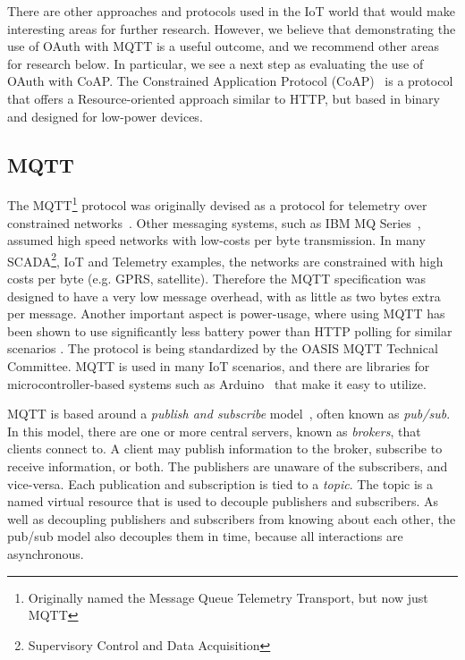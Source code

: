 \documentclass{IEEEtran}
\newif\iflong
\begin{document}
There are other approaches and protocols used in the IoT world that
would make interesting areas for further research. However, we believe that demonstrating the use of OAuth
with MQTT is a useful outcome, and we recommend other areas for research below. In particular, we see a next
step as evaluating the use of OAuth with CoAP. The Constrained Application Protocol 
(CoAP)~\cite{shelby2013constrained} is a protocol 
that offers a Resource-oriented approach similar to HTTP, but based in binary and designed for low-power devices. 
\fi

\subsection{MQTT}
The MQTT\footnote{Originally named the Message Queue Telemetry Transport, but now just MQTT} protocol was originally devised 
as a protocol for telemetry over constrained networks~\cite{mqtt-history}. Other messaging systems, such as IBM 
MQ Series~\cite{gilman1996distributed}, assumed high speed networks with low-costs per byte transmission. 
In many SCADA\footnote{Supervisory Control and Data Acquisition}, IoT and Telemetry examples, the networks are constrained 
with high costs per byte (e.g. GPRS, satellite). Therefore the MQTT specification was designed to have a very low message overhead, 
with as little as two bytes extra per message. Another important aspect is power-usage, where using MQTT has been shown to use significantly less battery power
than HTTP polling for similar scenarios \cite{nicholaspowerblog}.  The protocol is being standardized by the OASIS MQTT Technical Committee\cite{mqtt-oasis}. MQTT is used in many IoT scenarios, and there are libraries for microcontroller-based systems such as 
Arduino~\cite{arduino} that make it easy to utilize.

MQTT is based around a \emph{publish and subscribe} model~\cite{eugster2003many}, often known as \emph{pub/sub}.
In this model, there are one or more central servers, known as \emph{brokers}, that clients connect to.
A client may publish information to the broker, subscribe to receive information, or both. The publishers
are unaware of the subscribers, and vice-versa. Each publication and subscription is tied to a \emph{topic}. 
The topic is a named virtual resource that is used to decouple publishers and subscribers. As well as decoupling publishers and subscribers from knowing about each other, the pub/sub model also decouples them in time, because all interactions are asynchronous. 
\iflong
Most pub/sub systems utilize a tree-based model for topics, where there is a hierarchy and wildcard-based matching,
which allows subscribers to subscribe to all topics in a branch of the tree, and MQTT also follows this model. 
For example, a subscriber can subscribe to the topic string ``devices/uk/\#'' which would match topics including 
``devices/uk/hampshire/emsworth'' as well as ``devices/uk/sussex''. The ``\#'' identifies a wildcard that
matches any number of levels within the hierarchy. The ``+'' character identifies matching only a single level. Publishers cannot publish to a wildcard - they must publish to a fully-qualified topic name.
\fi
\end{document}
